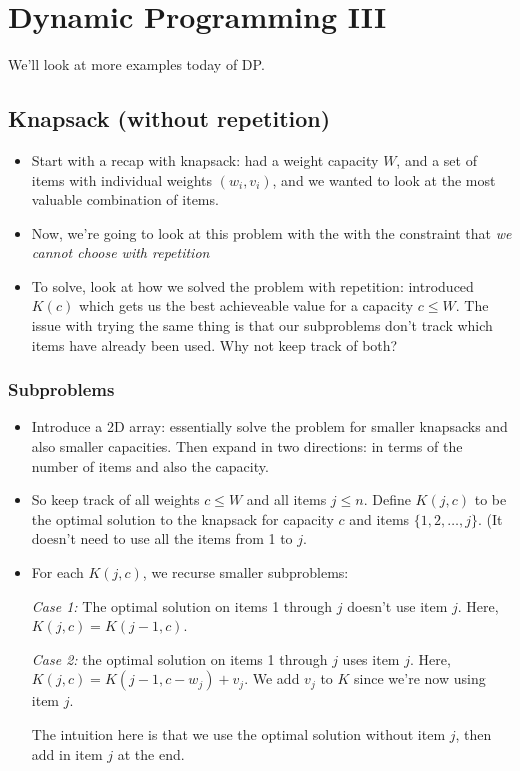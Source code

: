 \section{Dynamic Programming III}

We'll look at more examples today of DP.

\subsection{Knapsack (without repetition)}
\begin{itemize}
	\item Start with a recap with knapsack: had a weight capacity $W$, and a set of items with individual 
		weights $(w_i, v_i)$, and we wanted to look at the most valuable combination of items.
	\item Now, we're going to look at this problem with the with the constraint that \textit{we cannot 
		choose with repetition}
	\item To solve, look at how we solved the problem with repetition: introduced $K(c)$ which gets us 
		the best achieveable value for a capacity $c \le W$. The issue with trying the same thing 
		is that our subproblems don't track which items have already been used. Why not keep track of both? 
\end{itemize}

\subsubsection{Subproblems}
\begin{itemize}
	\item Introduce a 2D array: essentially solve the problem for smaller knapsacks and also smaller 
		capacities. Then expand in two directions: in terms of the number of items and also the 
		capacity.
	\item So keep track of all weights $c \le W$ and all items $j \le n$. Define $K(j, c)$ to be the 
		optimal solution to the knapsack for capacity $c$ and items $\{1, 2, \dots, j\} $. (It doesn't 
		need to use all the items from 1 to $j$.
	\item For each $K(j, c)$, we recurse smaller subproblems:

		\textit{Case 1:} The optimal solution on items 1 through $j$ doesn't use item $j$. 
					Here, $K(j, c) = K(j-1, c)$.


		\textit{Case 2:} the optimal solution on items 1 through $j$ uses item $j$.
		Here, $K(j, c) = K(j-1, c - w_j) + v_j$. We add $v_j$ to $K$ since we're now using item $j$.   

		The intuition here is that we use the optimal solution without item $j$, then add in item $j$ 
		at the end. 
\end{itemize}
